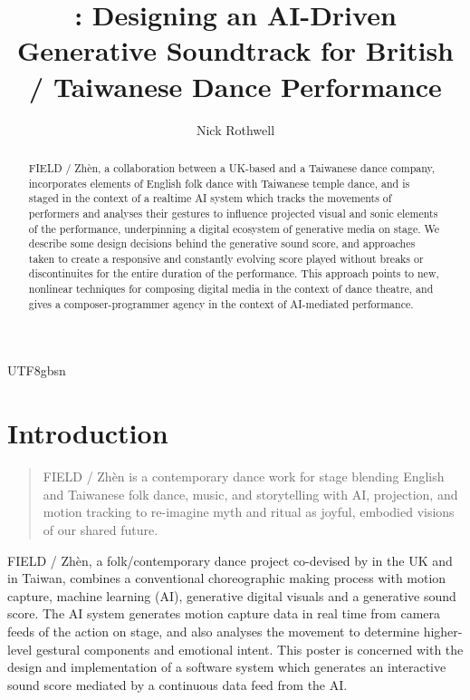 \documentclass[manuscript,review,anonymous,natbib=false]{acmart}
\title{\fz{}: Designing an AI-Driven Generative Soundtrack for British / Taiwanese Dance Performance}
\author{Nick Rothwell}
\newcommand{\fz}{FIELD / Zh\`{e}n}
\begin{document}
\begin{CJK*}{UTF8}{gbsn}

  \begin{abstract}
    \fz{}, a collaboration between a UK-based and a Taiwanese dance company, incorporates elements of English folk dance with Taiwanese temple dance, and is staged in the context of a realtime AI system which tracks the movements of performers and analyses their gestures to influence projected visual and sonic elements of the performance, underpinning a digital ecosystem of generative media on stage. We describe some design decisions behind the generative sound score, and approaches taken to create a responsive and constantly evolving score played without breaks or discontinuites for the entire duration of the performance. This approach points to new, nonlinear techniques for composing digital media in the context of dance theatre, and gives a composer-programmer agency in the context of AI-mediated performance.
  \end{abstract}

  \maketitle

  \section{Introduction}

  \begin{quote}
    \fz{} is a contemporary dance work for stage blending English and Taiwanese folk dance, music, and storytelling with AI, projection, and motion tracking to re-imagine myth and ritual as joyful, embodied visions of our shared future.
  \end{quote}

  \fz{}, a folk/contemporary dance project co-devised by \cite{noauthor_rebecca_nodate} in the UK and \cite{noauthor_anarchy_nodate} in Taiwan, combines a conventional choreographic making process with motion capture, machine learning (AI), generative digital visuals and a generative sound score. The AI system generates motion capture data in real time from camera feeds of the action on stage, and also analyses the movement to determine higher-level gestural components and emotional intent. This poster is concerned with the design and implementation of a software system which generates an interactive sound score mediated by a continuous data feed from the AI.


\end{CJK*}
\end{document}
